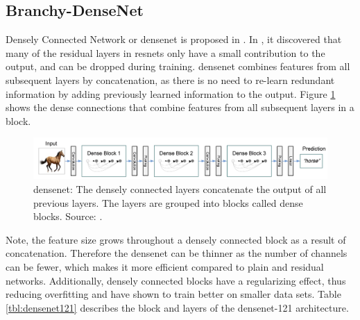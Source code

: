 \newpage\subsection{Branchy-DenseNet}

Densely Connected Network or \gls{densenet} is proposed in \cite{huang_densely_2016}. In \cite{huang_densely_2016}, it discovered that many of the residual layers in \gls{resnet}s only have a small contribution to the output, and can be dropped during training. \gls{densenet} combines features from all subsequent layers by concatenation, as there is no need to re-learn redundant information by adding previously learned information to the output. Figure \ref{fig:densenet} shows the dense connections that combine features from all subsequent layers in a block. 

\begin{figure}
	\centering
	\includegraphics[width=\linewidth]{figures/models/densenet}
	\caption[\gls{densenet}]{\gls{densenet}: The densely connected layers concatenate the output of all previous layers. The layers are grouped into blocks called dense blocks. Source:  \cite{huang_densely_2016}.}
	\label{fig:densenet}
\end{figure}
 
Note, the feature size grows throughout a densely connected block as a result of concatenation. Therefore the \gls{densenet} can be thinner as the number of channels can be fewer, which makes it more efficient compared to plain and residual networks. Additionally, densely connected blocks have a regularizing effect, thus reducing overfitting and have shown to train better on smaller data sets. Table \ref{tbl:densenet121} describes the block and layers of the \gls{densenet}-121 architecture.

